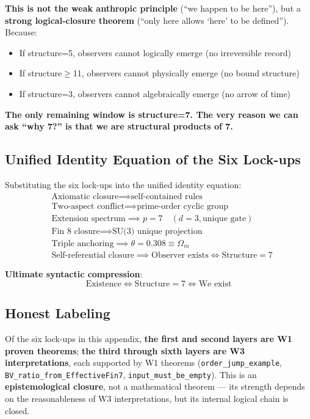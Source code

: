 \documentclass[aps,prd,twocolumn,nofootinbib,floatfix]{revtex4-2}
\begin{document}
\textbf{This is not the weak anthropic principle} (``we happen to be here''), but a \textbf{strong logical-closure theorem} (``only here allows `here' to be defined''). Because:
\begin{itemize}
    \item If structure=5, observers cannot logically emerge (no irreversible record)
    \item If structure$\geq$11, observers cannot physically emerge (no bound structure)
    \item If structure=3, observers cannot algebraically emerge (no arrow of time)
\end{itemize}

\textbf{The only remaining window is structure=7. The very reason we can ask ``why 7?'' is that we are structural products of 7.}

\subsection{Unified Identity Equation of the Six Lock-ups}

Substituting the six lock-ups into the unified identity equation:
$$
\boxed{
\begin{aligned}
&\text{Axiomatic closure} \implies \text{self-contained rules} \\
&\text{Two-aspect conflict} \implies \text{prime-order cyclic group} \\
&\text{Extension spectrum} \implies p=7 \quad (d=3, \text{unique gate}) \\
&\text{Fin 8 closure} \implies \text{SU(3) unique projection} \\
&\text{Triple anchoring} \implies \theta = 0.308 \equiv \Omega_m \\
&\text{Self-referential closure} \implies \text{Observer exists} \iff \text{Structure}=7
\end{aligned}
}
$$

\textbf{Ultimate syntactic compression}:
$$ \boxed{\text{Existence} \iff \text{Structure}=7 \iff \text{We exist}} $$

\subsection{Honest Labeling}

Of the six lock-ups in this appendix, \textbf{the first and second layers are W1 proven theorems}; \textbf{the third through sixth layers are W3 interpretations}, each supported by W1 theorems (\texttt{order\_jump\_example}, \texttt{BV\_ratio\_from\_EffectiveFin7}, \texttt{input\_must\_be\_empty}). This is an \textbf{epistemological closure}, not a mathematical theorem --- its strength depends on the reasonableness of W3 interpretations, but its internal logical chain is closed.
\end{document}
